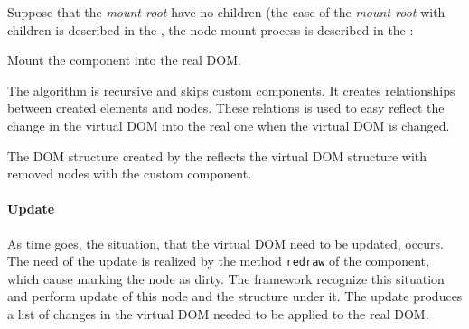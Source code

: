        Suppose that the \textit{mount root} have no children 
        (the case of the \textit{mount root} with children is described in the ,%
        the node mount process is described in the :
        \begin{algorithm}[H]
          \caption{Mount the component into the real DOM.}
          \label{algorithm:mount-node}
        \end{algorithm}

        The algorithm is recursive and skips custom components. 
        It creates relationships between created elements and nodes. 
        These relations is used to easy reflect the change in the virtual DOM into the real one 
        when the virtual DOM is changed.

        The DOM structure created by the  reflects the virtual DOM structure 
        with removed nodes with the custom component.

      \paragraph{Update}\label{par:our-architecture-rendering-browser-update} 
        
        As time goes, the situation, that the virtual DOM need to be updated, occurs. 
        The need of the update is realized by the method \texttt{redraw} of the component, 
        which cause marking the node as dirty.
        The framework recognize this situation and perform update of this node and the structure under it.
        The update produces a list of changes in the virtual DOM needed to be applied to the real DOM.

